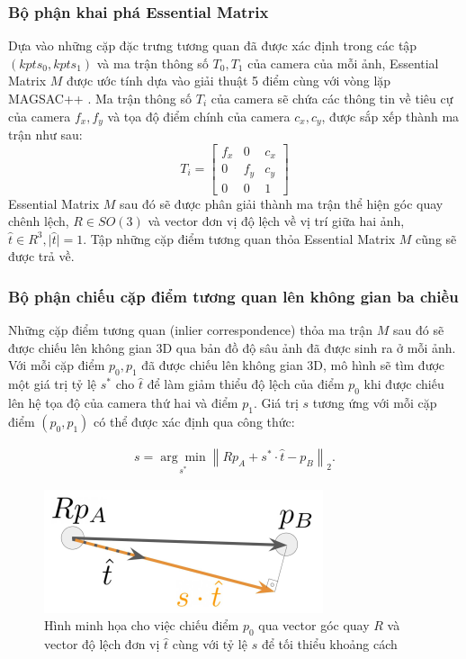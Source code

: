 \subsubsection{Bộ phận khai phá Essential Matrix}

Dựa vào những cặp đặc trưng tương quan đã được xác định trong các tập $(kpts_0, kpts_1)$ và ma trận thông số $T_0, T_1$ của camera của mỗi ảnh, Essential Matrix $M$ được ước tính dựa vào giải thuật 5 điểm \cite{nister2004efficient} cùng với vòng lặp MAGSAC++ \cite{barath2020magsac++}. Ma trận thông số $T_i$ của camera sẽ chứa các thông tin về tiêu cự của camera $f_x,f_y$ và tọa độ điểm chính của camera $c_x,c_y$, được sắp xếp thành ma trận như sau:
\begin{equation}
  T_i = \begin{bmatrix} f_x & 0 & c_x \\ 0 & f_y & c_y \\ 0 & 0 & 1 \end{bmatrix}
\end{equation}
Essential Matrix $M$ sau đó sẽ được phân giải thành ma trận thể hiện góc quay chênh lệch, $R \in SO(3)$ và vector đơn vị độ lệch về vị trí giữa hai ảnh, $\hat{t} \in R^{3}, \lvert \hat{t} \rvert = 1$. Tập những cặp điểm tương quan thỏa Essential Matrix $M$ cũng sẽ được trả về.

\subsubsection{Bộ phận chiếu cặp điểm tương quan lên không gian ba chiều}

Những cặp điểm tương quan (inlier correspondence) thỏa ma trận $M$ sau đó sẽ được chiếu lên không gian 3D qua bản đồ độ sâu ảnh đã được sinh ra ở mỗi ảnh. Với mỗi cặp điểm $p_0, p_1$ đã được chiếu lên không gian 3D, mô hình sẽ tìm được một giá trị tỷ lệ $s^*$ cho $\hat{t}$ để làm giảm thiểu độ lệch của điểm $p_0$ khi được chiếu lên hệ tọa độ của camera thứ hai và điểm $p_1$. Giá trị $s$ tương ứng với mỗi cặp điểm $(p_0, p_1)$ có thể được xác định qua công thức:

\begin{equation}
  \begin{aligned}
    s=\underset{s^*}{\arg \min }\left\|R p_A+s^* \cdot \hat{t}-p_B\right\|_2 .
  \end{aligned}
\end{equation}

\begin{figure}[H]
  \centering
  \includegraphics[scale=1]{pics/Proposal/reprojection.png}
  \caption[Minh họa cho việc xác định tỷ lệ $s$ bằng độ sâu ảnh]{Hình minh họa cho việc chiếu điểm $p_0$ qua vector góc quay $R$ và vector độ lệch đơn vị $\hat{t}$ cùng với tỷ lệ $s$ để tối thiểu khoảng cách \cite{arnold2022mapfree}}
\end{figure}


